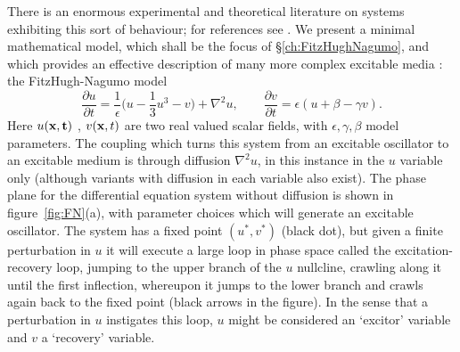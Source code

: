 There is an enormous experimental and theoretical literature on systems exhibiting this sort of behaviour; for references see \citep{WinfreeBook}. We present a minimal mathematical model, which shall be the focus of \S\ref{ch:FitzHughNagumo}, and which provides an effective description of many more complex excitable media \citep{WinfreeBook}: the FitzHugh-Nagumo model \citep{FitzHugh1961,Nagumo1962}
\begin{equation}
\frac{\partial u}{ \partial t} = \frac{1}{\epsilon}\biggl(u - \frac{1}{3}u^3 -v\biggr) + \nabla^{2} u,\hspace{2em}    \frac{\partial v}{ \partial t} = {\epsilon}(u + \beta -\gamma v) .
\label{eq:FNIntro}
\end{equation}
Here $u(\bf {x} ,t)$ , $v({\bf x},t)$ are two real valued scalar fields, with $\epsilon,\gamma,\beta$ model parameters. The coupling which turns this system from an excitable oscillator to an excitable medium is through diffusion $\nabla^2 u$, in this instance in the $u$ variable only (although variants with diffusion in each variable also exist). The phase plane for the differential equation system without diffusion is shown in figure~\ref{fig:FN}(a), with parameter choices which will generate an excitable oscillator. The system has a fixed point $(u^*,v^*)$ (black dot), but given a finite perturbation in $u$ it will execute a large loop in phase space called the excitation-recovery loop, jumping to the upper branch of the $u$ nullcline, crawling along it until the first inflection, whereupon it jumps to the lower branch and crawls again back to the fixed point (black arrows in the figure). In the sense that a perturbation in $u$ instigates this loop, $u$ might be considered an `excitor' variable and $v$ a `recovery' variable.

